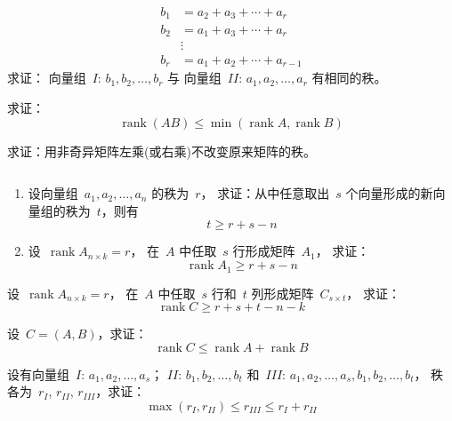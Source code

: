 \documentclass[twoside,openright]{book}
\begin{document}
\begin{CJK*}{UTF8}{}
\begin{quest}
\label{quest:132}
\[
\begin{split}
b_1 &= a_2 + a_3 + \dotsb + a_r     \\
b_2 &= a_1 + a_3 + \dotsb + a_r     \\
    &\vdots                         \\
b_r &= a_1 + a_2 + \dotsb + a_{r-1}
\end{split}
\]
求证：
向量组\ $I$: $b_1,b_2,\dots,b_r$ 与
向量组\ $II$: $a_1,a_2,\dots,a_r$ 有相同的秩。
\end{quest}

\begin{quest}
\label{quest:133}
求证：
\[
\operatorname{rank} (AB) \leq \min (\operatorname{rank} A,\operatorname{rank} B)
\]
\end{quest}

\begin{quest}
\label{quest:134}
求证：用非奇异矩阵左乘(或右乘)不改变原来矩阵的秩。
\end{quest}

\begin{quest}
\label{quest:135}
$ $

\begin{enumerate}
\item
设向量组\ $a_1,a_2,\dots,a_n$ 的秩为\ $r$，
求证：从中任意取出\ $s$ 个向量形成的新向量组的秩为\ $t$，则有
\[
t \geq r + s -n
\]
\item
设\ $\operatorname{rank} A_{n \times k} = r$，
在\ $A$ 中任取\ $s$ 行形成矩阵\ $A_1$，
求证：
\[
\operatorname{rank} A_1 \geq r + s -n
\]
\end{enumerate}
\end{quest}

\begin{quest}
\label{quest:136}
设\ $\operatorname{rank} A_{n \times k} = r$，
在\ $A$ 中任取\ $s$ 行和\ $t$ 列形成矩阵\ $C_{s \times t}$，
求证：
\[
\operatorname{rank} C \geq r + s + t - n - k
\]
\end{quest}

\begin{quest}
\label{quest:137}
设\ $C = (A,B)$，求证：
\[
\operatorname{rank} C \leq \operatorname{rank} A + \operatorname{rank} B
\]
\end{quest}

\begin{quest}
\label{quest:138}
设有向量组\ $I$: $a_1,a_2,\dots,a_s$；
$II$: $b_1,b_2,\dots,b_t$ 和\ $III$: $a_1,a_2,\dots,a_s,b_1,b_2,\dots,b_t$，
秩各为\ $r_{I}$, $r_{II}$, $r_{III}$，求证：
\[
\max (r_{I},r_{II}) \leq r_{III} \leq r_{I} + r_{II}
\]
\end{quest}


\end{CJK*}
\end{document}
